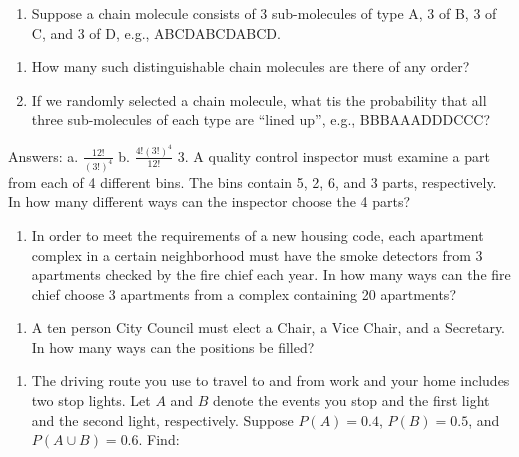 \documentclass[]{book}
\providecommand{\tightlist}{%
  \setlength{\itemsep}{0pt}\setlength{\parskip}{0pt}}
\begin{document}
\begin{enumerate}
\def\labelenumi{\arabic{enumi}.}
\setcounter{enumi}{1}
\tightlist
\item
  Suppose a chain molecule consists of 3 sub-molecules of type A, 3 of
  B, 3 of C, and 3 of D, e.g., ABCDABCDABCD.\\
\end{enumerate}

\begin{enumerate}
\def\labelenumi{\alph{enumi}.}
\tightlist
\item
  How many such distinguishable chain molecules are there of any order? 
\item
  If we randomly selected a chain molecule, what tis the probability
  that all three sub-molecules of each type are ``lined up'', e.g.,
  BBBAAADDDCCC?
\end{enumerate}

Answers: a. \(\frac{12!}{(3!)^4}\) b. \(\frac{4!(3!)^4}{12!}\) 3. A
quality control inspector must examine a part from each of 4 different
bins. The bins contain 5, 2, 6, and 3 parts, respectively. In how many
different ways can the inspector choose the 4 parts?

\begin{enumerate}
\def\labelenumi{\arabic{enumi}.}
\setcounter{enumi}{3}
\tightlist
\item
  In order to meet the requirements of a new housing code, each
  apartment complex in a certain neighborhood must have the smoke
  detectors from 3 apartments checked by the fire chief each year. In
  how many ways can the fire chief choose 3 apartments from a complex
  containing 20 apartments?
\end{enumerate}

\begin{enumerate}
\def\labelenumi{\arabic{enumi}.}
\setcounter{enumi}{4}
\tightlist
\item
  A ten person City Council must elect a Chair, a Vice Chair, and a
  Secretary. In how many ways can the positions be filled?
\end{enumerate}

\begin{enumerate}
\def\labelenumi{\arabic{enumi}.}
\setcounter{enumi}{5}
\tightlist
\item
  The driving route you use to travel to and from work and your home
  includes two stop lights. Let \(A\) and \(B\) denote the events you
  stop and the first light and the second light, respectively. Suppose
  \(P(A) = 0.4\), \(P(B) = 0.5\), and \(P(A\cup B) = 0.6\). Find:
\end{enumerate}
\end{document}
